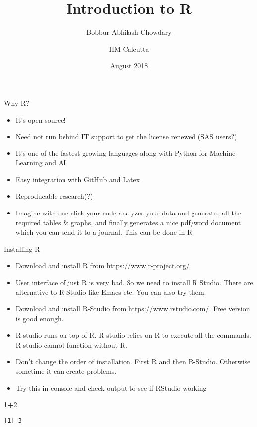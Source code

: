 \documentclass[ignorenonframetext,]{beamer}
\title{Introduction to R}
\author{Bobbur Abhilash Chowdary \and IIM Calcutta}
\date{August 2018}
\newenvironment{Shaded}{\begin{snugshade}}{\end{snugshade}}
\newcommand{\DecValTok}[1]{\textcolor[rgb]{0.00,0.00,0.81}{#1}}
\newcommand{\OperatorTok}[1]{\textcolor[rgb]{0.81,0.36,0.00}{\textbf{#1}}}
\providecommand{\tightlist}{%
  \setlength{\itemsep}{0pt}\setlength{\parskip}{0pt}}
\begin{document}
\frame{\titlepage}

\begin{frame}{Why R?}
\protect\hypertarget{why-r}{}

\begin{itemize}[<+->]
\tightlist
\item
  It's open source!
\item
  Need not run behind IT support to get the license renewed (SAS users?)
\item
  It's one of the fastest growing languages along with Python for
  Machine Learning and AI
\item
  Easy integration with GitHub and Latex
\item
  Reproducable research(?)
\item
  Imagine with one click your code analyzes your data and generates all
  the required tables \& graphs, and finally generates a nice pdf/word
  document which you can send it to a journal. This can be done in R.
\end{itemize}

\end{frame}

\begin{frame}[fragile]{Installing R}
\protect\hypertarget{installing-r}{}

\begin{itemize}
\item
  Download and install R from \url{https://www.r-project.org/}
\item
  User interface of just R is very bad. So we need to install R Studio.
  There are alternative to R-Studio like Emacs etc. You can also try
  them.
\item
  Download and install R-Studio from \url{https://www.rstudio.com/}.
  Free version is good enough.
\item
  R-studio runs on top of R. R-studio relies on R to execute all the
  commands. R-studio cannot function without R.
\item
  Don't change the order of installation. First R and then R-Studio.
  Otherwise sometime it can create problems.
\item
  Try this in console and check output to see if RStudio working
\end{itemize}

\begin{Shaded}
\begin{Highlighting}[]
\DecValTok{1}\OperatorTok{+}\DecValTok{2}
\end{Highlighting}
\end{Shaded}

\begin{verbatim}
[1] 3
\end{verbatim}

\end{frame}
\end{document}
